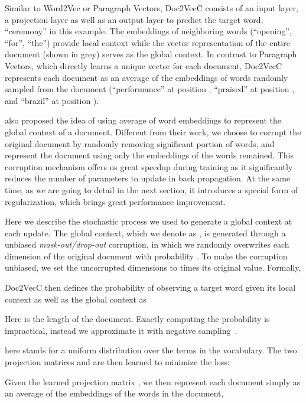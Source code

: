 \documentclass{article} \usepackage{iclr2017_conference,times}
\newcommand{\name}{Doc2VecC}
\begin{document}
Similar to Word2Vec or Paragraph Vectors, \name{} consists of an input layer, a projection layer as well as an output layer to predict the target word, ``ceremony'' in this example. The embeddings of neighboring words (``opening'', ``for'', ``the'') provide local context while the vector representation of the entire document (shown in grey) serves as the global context.  In contrast to Paragraph Vectors, which directly learns a unique vector for each document, \name{} represents each document as an average of the embeddings of words randomly sampled from the document (``performance'' at position , ``praised'' at position , and ``brazil'' at position ). 

\cite{huang2012improving} also proposed the idea of using average of word embeddings to represent the global context of a document. Different from their work, we choose to corrupt the original document by randomly removing significant portion of words, and represent the document using only the embeddings of the words remained.  This corruption mechanism offers us great speedup during training as it significantly reduces the number of parameters to update in back propagation. At the same time, as we are going to detail in the next section, it introduces a special form of regularization, which brings  great performance improvement. 



Here we describe the stochastic process we used to generate a global context at each update. 
The global context, which we denote as , is generated through a unbiased \textit{mask-out/drop-out} corruption, in which we randomly overwrites each dimension of the original document  with probability . To make the corruption unbiased, we set the uncorrupted dimensions to  times its original value.  Formally,
  
\name{} then defines the probability of observing a target word  given its local context  as well as the global context  as

Here  is the length of the document.
Exactly computing the probability is impractical, instead we approximate it with negative sampling~\citep{mikolov2013efficient}. 

here  stands for a uniform distribution over the terms in the vocabulary. The two projection matrices  and  are then learned to minimize the loss:


Given the learned projection matrix , we then represent each document simply as an average of the embeddings of the words in the document,
\end{document}
